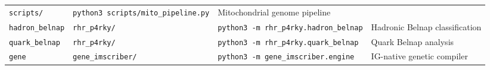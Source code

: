 \begin{longtable}[]{@{}llll@{}}
\begin{minipage}[t]{0.24\columnwidth}
\texttt{scripts/}\strut
\end{minipage} & \begin{minipage}[t]{0.19\columnwidth}\raggedright
\texttt{python3\ scripts/mito\_pipeline.py}\strut
\end{minipage} & \begin{minipage}[t]{0.28\columnwidth}\raggedright
Mitochondrial genome pipeline\strut
\end{minipage}\tabularnewline
\begin{minipage}[t]{0.17\columnwidth}\raggedright
\texttt{hadron\_belnap}\strut
\end{minipage} & \begin{minipage}[t]{0.24\columnwidth}\raggedright
\texttt{rhr\_p4rky/}\strut
\end{minipage} & \begin{minipage}[t]{0.19\columnwidth}\raggedright
\texttt{python3\ -m\ rhr\_p4rky.hadron\_belnap}\strut
\end{minipage} & \begin{minipage}[t]{0.28\columnwidth}\raggedright
Hadronic Belnap classification\strut
\end{minipage}\tabularnewline
\begin{minipage}[t]{0.17\columnwidth}\raggedright
\texttt{quark\_belnap}\strut
\end{minipage} & \begin{minipage}[t]{0.24\columnwidth}\raggedright
\texttt{rhr\_p4rky/}\strut
\end{minipage} & \begin{minipage}[t]{0.19\columnwidth}\raggedright
\texttt{python3\ -m\ rhr\_p4rky.quark\_belnap}\strut
\end{minipage} & \begin{minipage}[t]{0.28\columnwidth}\raggedright
Quark Belnap analysis\strut
\end{minipage}\tabularnewline
\begin{minipage}[t]{0.17\columnwidth}\raggedright
\texttt{gene}\strut
\end{minipage} & \begin{minipage}[t]{0.24\columnwidth}\raggedright
\texttt{gene\_imscriber/}\strut
\end{minipage} & \begin{minipage}[t]{0.19\columnwidth}\raggedright
\texttt{python3\ -m\ gene\_imscriber.engine}\strut
\end{minipage} & \begin{minipage}[t]{0.28\columnwidth}\raggedright
IG-native genetic compiler\strut

\end{minipage}
\end{longtable}
